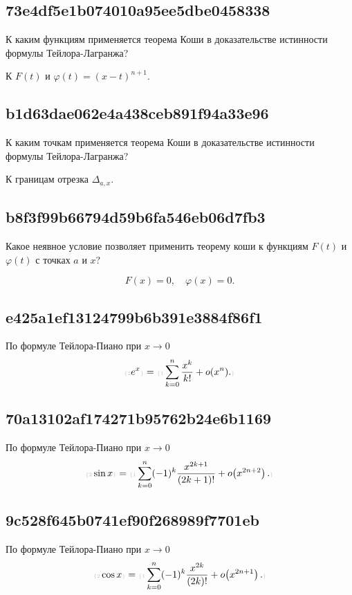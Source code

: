 \documentclass[11pt, a5paper]{article}
\newenvironment{note}[1]{\goodbreak\par\subsection{\hfill \color{lightgray}\tiny #1}}{}
\newenvironment{cloze}[2][\ldots]{\begin{leftbar}}{\end{leftbar}}
\newenvironment{icloze}[2][\ldots]{%
  \ignorespaces\text{\tiny \color{lightgray}\{#2} %
}{%
  \text{\tiny\color{lightgray}\}}\unskip%
}
\begin{document}
\begin{note}{73e4df5e1b074010a95ee5dbe0458338}
    К каким функциям применяется теорема Коши в доказательстве истинности формулы Тейлора-Лагранжа?

    \begin{cloze}{1}
        К \( F(t) \) и \( \varphi(t) = (x - t)^{n + 1}  \).
    \end{cloze}
\end{note}

\begin{note}{b1d63dae062e4a438ceb891f94a33e96}
    К каким точкам применяется теорема Коши в доказательстве истинности формулы Тейлора-Лагранжа?

    \begin{cloze}{1}
        К границам отрезка \( \Delta _{a, x}  \).
    \end{cloze}
\end{note}

\begin{note}{b8f3f99b66794d59b6fa546eb06d7fb3}
    Какое неявное условие позволяет применить теорему коши к функциям \( F(t) \) и \( \varphi(t) \) с точках \( a \) и \( x \)?

    \begin{cloze}{1}
        \[
            F(x) = 0, \quad \varphi(x) = 0.
        \]
    \end{cloze}
\end{note}

\begin{note}{e425a1ef13124799b6b391e3884f86f1}
    По формуле Тейлора-Пиано при \( x \to 0 \)
    \[
        \begin{icloze}{2}e^{x}\end{icloze} = \begin{icloze}{1}\sum_{k=0}^{n} \frac{x^{k} }{k! } + o(x^{n} ).\end{icloze}
    \]
\end{note}

\begin{note}{70a13102af174271b95762b24e6b1169}
    По формуле Тейлора-Пиано при \( x \to 0 \)
    \[
        \begin{icloze}{2}\sin x\end{icloze} = \begin{icloze}{1}\sum_{k=0}^{n} (-1)^{k} \frac{x^{2k + 1} }{(2k + 1)! } + o\!\left(x^{2n + 2}\right). \end{icloze}
    \]
\end{note}

\begin{note}{9c528f645b0741ef90f268989f7701eb}
    По формуле Тейлора-Пиано при \( x \to 0 \)
    \[
        \begin{icloze}{2}\cos x\end{icloze} = \begin{icloze}{1}\sum_{k=0}^{n} (-1)^{k} \frac{x^{2k} }{(2k)! } + o\!\left(x^{2n + 1}\right). \end{icloze}
    \]
\end{note}
\end{document}
